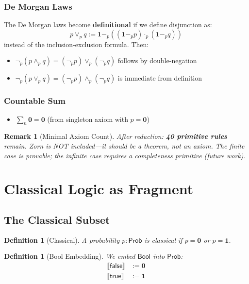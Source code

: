 \documentclass[11pt,a4paper]{article}
\newtheorem{definition}[theorem]{Definition}
\newtheorem{remark}[theorem]{Remark}
\newcommand{\Prob}{\mathsf{Prob}}
\newcommand{\pand}{\wedge_p}
\newcommand{\por}{\vee_p}
\newcommand{\pnot}{\neg_p}
\newcommand{\pzero}{\mathbf{0}}
\newcommand{\pone}{\mathbf{1}}
\newcommand{\pmul}{\cdot_p}
\newcommand{\psub}{-_p}
\newcommand{\Bool}{\mathsf{Bool}}
\newcommand{\true}{\mathsf{true}}
\newcommand{\false}{\mathsf{false}}
\begin{document}
\subsubsection*{De Morgan Laws}
The De Morgan laws become \textbf{definitional} if we define disjunction as:
\[
p \por q := \pone \psub ((\pone \psub p) \pmul (\pone \psub q))
\]
instead of the inclusion-exclusion formula. Then:
\begin{itemize}
    \item $\pnot(p \pand q) = (\pnot p) \por (\pnot q)$ follows by double-negation
    \item $\pnot(p \por q) = (\pnot p) \pand (\pnot q)$ is immediate from definition
\end{itemize}

\subsubsection*{Countable Sum}
\begin{itemize}
    \item $\sum_n \pzero = \pzero$ (from singleton axiom with $p = \pzero$)
\end{itemize}

\begin{remark}[Minimal Axiom Count]
After reduction: \textbf{40 primitive rules} remain. Zorn is NOT included---it should be a theorem, not an axiom. The finite case is provable; the infinite case requires a completeness primitive (future work).
\end{remark}

\section{Classical Logic as Fragment}

\subsection{The Classical Subset}

\begin{definition}[Classical]
A probability $p : \Prob$ is \emph{classical} if $p = \pzero$ or $p = \pone$.
\end{definition}

\begin{definition}[Bool Embedding]
We embed $\Bool$ into $\Prob$:
\begin{align}
\llbracket \false \rrbracket &:= \pzero \\
\llbracket \true \rrbracket &:= \pone
\end{align}
\end{definition}
\end{document}
